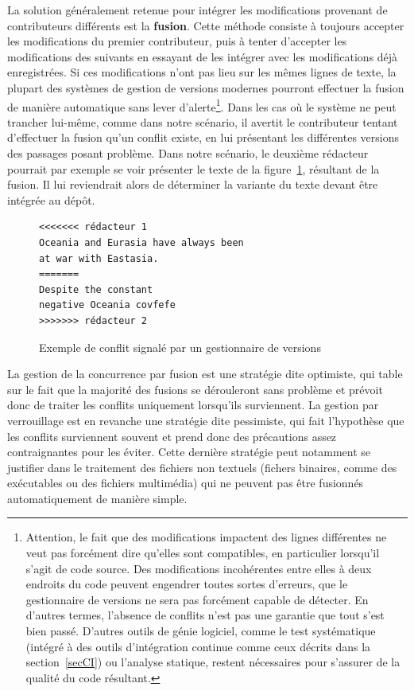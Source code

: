 La solution généralement retenue pour intégrer les modifications
provenant de contributeurs différents est la
\textbf{fusion}. Cette méthode consiste à toujours
accepter les modifications du premier contributeur, puis à tenter
d'accepter les modifications des suivants en essayant de les intégrer
avec les modifications déjà enregistrées. Si ces modifications n'ont
pas lieu sur les mêmes lignes de texte, la plupart des systèmes de
gestion de versions modernes pourront effectuer la fusion de manière
automatique sans lever d'alerte\footnote{Attention, le fait que des
  modifications impactent des lignes différentes ne veut pas forcément
  dire qu'elles sont compatibles, en particulier lorsqu'il s'agit de
  code source. Des modifications incohérentes entre elles à deux
  endroits du code peuvent engendrer toutes sortes d'erreurs, que le
  gestionnaire de versions ne sera pas forcément capable de
  détecter. En d'autres termes, l'absence de conflits n'est pas une
  garantie que tout s'est bien passé. D'autres outils de génie
  logiciel, comme le test systématique (intégré à des outils
  d'intégration continue comme ceux décrits dans la
  section~\ref{secCI}) ou l'analyse statique, restent nécessaires pour
  s'assurer de la qualité du code résultant.}. Dans les cas où le
système ne peut trancher lui-même, comme dans notre scénario, il
avertit le contributeur tentant d'effectuer la fusion qu'un conflit
existe, en lui présentant les différentes versions des passages posant
problème. Dans notre scénario, le deuxième rédacteur pourrait par
exemple se voir présenter le texte de la figure~\ref{fig:conflitTxt},
résultant de la fusion. Il lui reviendrait alors de déterminer la
variante du texte devant être intégrée au dépôt.

\begin{figure}[h!]
\begin{minipage}{7cm}
\begin{lstlisting}
<<<<<<< rédacteur 1
Oceania and Eurasia have always been
at war with Eastasia.
=======
Despite the constant
negative Oceania covfefe
>>>>>>> rédacteur 2
\end{lstlisting}
\end{minipage}
\caption{Exemple de conflit signalé par un gestionnaire de
  versions\label{fig:conflitTxt}}
\end{figure}

La gestion de la concurrence par fusion est une stratégie dite \og
optimiste\fg, qui table sur le fait que la majorité des fusions se
dérouleront sans problème et prévoit donc de traiter les conflits
uniquement lorsqu'ils surviennent. La gestion par verrouillage est en
revanche une stratégie dite \og pessimiste\fg, qui fait l'hypothèse
que les conflits surviennent souvent et prend donc des précautions
assez contraignantes pour les éviter. Cette dernière stratégie peut
notamment se justifier dans le traitement des fichiers non textuels
(fichers binaires, comme des exécutables ou des fichiers multimédia)
qui ne peuvent pas être fusionnés automatiquement de manière simple.

